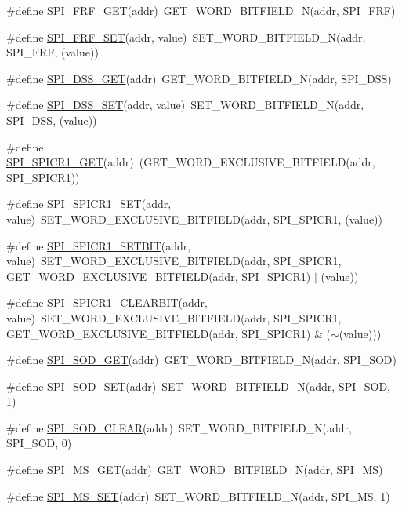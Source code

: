 \begin{DoxyCompactItemize}
\item 
\#define \hyperlink{a00572_a47ff474ff56bd6785caa7dc71f753ef6}{SPI\_\-FRF\_\-GET}(addr)~GET\_\-WORD\_\-BITFIELD\_\-N(addr, SPI\_\-FRF)
\item 
\#define \hyperlink{a00572_a230cedb6a867587316775f4c1b4d6e32}{SPI\_\-FRF\_\-SET}(addr, value)~SET\_\-WORD\_\-BITFIELD\_\-N(addr, SPI\_\-FRF, (value))
\item 
\#define \hyperlink{a00572_a08d50aff637634882be2f36c08e63d3c}{SPI\_\-DSS\_\-GET}(addr)~GET\_\-WORD\_\-BITFIELD\_\-N(addr, SPI\_\-DSS)
\item 
\#define \hyperlink{a00572_a791c6dd63f23e98d205a25e09779902a}{SPI\_\-DSS\_\-SET}(addr, value)~SET\_\-WORD\_\-BITFIELD\_\-N(addr, SPI\_\-DSS, (value))
\item 
\#define \hyperlink{a00572_a98bed73a2c3590ec21e9f1ca8b889810}{SPI\_\-SPICR1\_\-GET}(addr)~(GET\_\-WORD\_\-EXCLUSIVE\_\-BITFIELD(addr, SPI\_\-SPICR1))
\item 
\#define \hyperlink{a00572_a28add3d00a65b710d51bfd7942c38472}{SPI\_\-SPICR1\_\-SET}(addr, value)~SET\_\-WORD\_\-EXCLUSIVE\_\-BITFIELD(addr, SPI\_\-SPICR1, (value))
\item 
\#define \hyperlink{a00572_a8972721f86be5c5a12063afe56d5a276}{SPI\_\-SPICR1\_\-SETBIT}(addr, value)~SET\_\-WORD\_\-EXCLUSIVE\_\-BITFIELD(addr, SPI\_\-SPICR1, GET\_\-WORD\_\-EXCLUSIVE\_\-BITFIELD(addr, SPI\_\-SPICR1) $|$ (value))
\item 
\#define \hyperlink{a00572_a9905dc52bb4da5e86a2ec304f10b83a7}{SPI\_\-SPICR1\_\-CLEARBIT}(addr, value)~SET\_\-WORD\_\-EXCLUSIVE\_\-BITFIELD(addr, SPI\_\-SPICR1, GET\_\-WORD\_\-EXCLUSIVE\_\-BITFIELD(addr, SPI\_\-SPICR1) \& ($\sim$(value)))
\item 
\#define \hyperlink{a00572_a98f10c5124ad073b899411022c8cb0dd}{SPI\_\-SOD\_\-GET}(addr)~GET\_\-WORD\_\-BITFIELD\_\-N(addr, SPI\_\-SOD)
\item 
\#define \hyperlink{a00572_ae01b57d57c228a9b5ba09a9191c6eb0d}{SPI\_\-SOD\_\-SET}(addr)~SET\_\-WORD\_\-BITFIELD\_\-N(addr, SPI\_\-SOD, 1)
\item 
\#define \hyperlink{a00572_a6a90d61963877934794ca07120760df4}{SPI\_\-SOD\_\-CLEAR}(addr)~SET\_\-WORD\_\-BITFIELD\_\-N(addr, SPI\_\-SOD, 0)
\item 
\#define \hyperlink{a00572_a303a00c5809be25449430a0149479ea8}{SPI\_\-MS\_\-GET}(addr)~GET\_\-WORD\_\-BITFIELD\_\-N(addr, SPI\_\-MS)
\item 
\#define \hyperlink{a00572_a2d0f3afa651dd43236af3e871f68250a}{SPI\_\-MS\_\-SET}(addr)~SET\_\-WORD\_\-BITFIELD\_\-N(addr, SPI\_\-MS, 1)

\end{DoxyCompactItemize}
